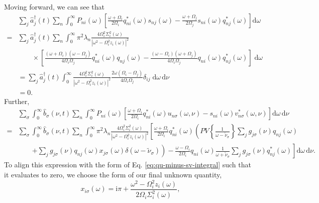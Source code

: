 Moving forward, we can see that
\begin{equation}
\begin{split}
&\sum_j\hat{a}_j^\dagger(t)\sum_n\int_0^\infty P_{ni}(\omega)\left[\frac{\omega + \Omega_i}{2\Omega_i}q_{ni}^*(\omega)s_{nj}(\omega) - \frac{\omega + \Omega_j}{2\Omega_j}s_{ni}(\omega)q_{nj}^*(\omega)\right]\mathrm{d}\omega\\
= &\sum_j\hat{a}_j^\dagger(t)\sum_n\int_0^\infty \pi^2\lambda_n\frac{4\Omega_i^2\Sigma_i^2(\omega)}{|\omega^2 - \Omega_i^2z_i(\omega)|^2}\\
&\qquad\times\left[\frac{(\omega + \Omega_i)(\omega - \Omega_j)}{4\Omega_i\Omega_j}q_{ni}^*(\omega)q_{nj}(\omega) - \frac{(\omega - \Omega_i)(\omega + \Omega_j)}{4\Omega_i\Omega_j}q_{ni}(\omega)q_{nj}^*(\omega)\right]\;\mathrm{d}\omega\\
&= \sum_j\hat{a}_j^\dagger(t)\int_0^\infty\frac{4\Omega_i^2\Sigma_i^2(\omega)}{|\omega^2 - \Omega_i^2z_i(\omega)|^2}\frac{2\omega(\Omega_i - \Omega_j)}{4\Omega_i\Omega_j}\delta_{ij}\;\mathrm{d}\omega\,\mathrm{d}\nu\\
&= 0.
\end{split}
\end{equation}
Further,
\begin{equation}
\begin{split}
&\sum_\sigma\int_0^\infty\hat{b}_\sigma(\nu,t)\sum_n\int_0^\infty P_{ni}(\omega)\left[\frac{\omega + \Omega_i}{2\Omega_i}q_{ni}^*(\omega)u_{n\sigma}(\omega,\nu) - s_{ni}(\omega)v_{n\sigma}^*(\omega,\nu)\right]\mathrm{d}\omega\,\mathrm{d}\nu\\
= &\sum_\sigma\int_0^\infty\hat{b}_\sigma(\nu,t)\sum_n\int_0^\infty \pi^2\lambda_n\frac{4\Omega_i^2\Sigma_i^2(\omega)}{|\omega^2 - \Omega_i^2z_i(\omega)|^2}\left[\frac{\omega + \Omega_i}{2\Omega_i}q_{ni}^*(\omega)\left(PV\left\{\frac{1}{\omega - \tilde{\nu}_\sigma}\right\}\sum_jg_{j\sigma}(\nu)q_{nj}(\omega)\right.\right.\\
&\qquad\left.\left. + \sum_jg_{j\sigma}(\nu)q_{nj}(\omega)x_{j\sigma}(\omega)\delta(\omega - \tilde{\nu}_\sigma)\right) - \frac{\omega - \Omega_i}{2\Omega_i}q_{ni}(\omega)\frac{1}{\omega + \tilde{\nu}_\sigma}\sum_jg_{j\sigma}(\nu)q_{nj}^*(\omega)\right]\mathrm{d}\omega\,\mathrm{d}\nu.
\end{split}
\end{equation}
To align this expression with the form of Eq. \eqref{eq:qu-minus-sv-integral} such that it evaluates to zero, we choose the form of our final unknown quantity,
\begin{equation}
x_{i\sigma}(\omega) = \mathrm{i}\pi + \frac{\omega^2 - \Omega_i^2z_i(\omega)}{2\Omega_i\Sigma_i^2(\omega)},
\end{equation}
